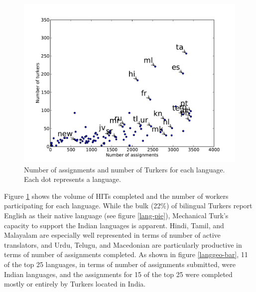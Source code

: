 \documentclass[11pt]{article}
\begin{document}
\begin{figure}[h]
\centering
\includegraphics[width=6in]{figures/assign-turk-scatter}
\caption{Number of assignments and number of Turkers for each language. Each dot represents a language.}
\label{ass-scatter}
\end{figure}



Figure \ref{ass-scatter} shows the volume of HITs completed and the number of workers participating for each language. While the bulk (22\%) of bilingual Turkers report English as their native language (see figure \ref{lang-pie}), Mechanical Turk's capacity to support the Indian languages is apparent. Hindi, Tamil, and Malayalam are especially well represented in terms of number of active translators, and Urdu, Telugu, and Macedonian are particularly productive in terms of number of assignments completed. As shown in figure \ref{langgeo-bar}, 11 of the top 25 languages, in terms of number of assignments submitted, were Indian languages, and the assignments for 15 of the top 25 were completed mostly or entirely by Turkers located in India. 

\end{document}
